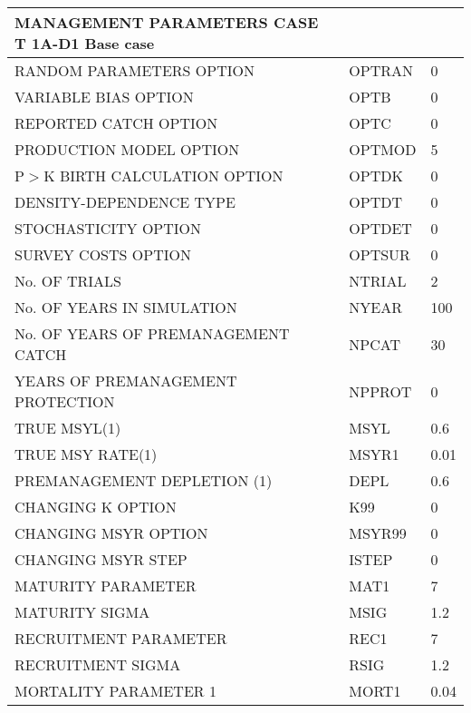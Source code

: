 \begin{table}[ht]
\centering
\begin{tabular}{lll}
 MANAGEMENT PARAMETERS         CASE  T 1A-D1 
Base case &  &  \\ 
  \hline
RANDOM PARAMETERS OPTION              & OPTRAN  & 0    \\ 
  VARIABLE BIAS OPTION                  & OPTB    & 0    \\ 
  REPORTED CATCH OPTION                 & OPTC    & 0    \\ 
  PRODUCTION MODEL OPTION               & OPTMOD  & 5    \\ 
  P$>$K BIRTH CALCULATION OPTION          & OPTDK   & 0    \\ 
  DENSITY-DEPENDENCE TYPE               & OPTDT   & 0    \\ 
  STOCHASTICITY OPTION                  & OPTDET  & 0    \\ 
  SURVEY COSTS OPTION                   & OPTSUR  & 0    \\ 
  No. OF TRIALS                         & NTRIAL  & 2    \\ 
  No. OF YEARS IN SIMULATION            & NYEAR   & 100  \\ 
  No. OF YEARS OF PREMANAGEMENT CATCH   & NPCAT   & 30   \\ 
  YEARS OF PREMANAGEMENT PROTECTION     & NPPROT  & 0    \\ 
  TRUE MSYL(1)                          & MSYL    & 0.6  \\ 
  TRUE MSY RATE(1)                      & MSYR1   & 0.01 \\ 
  PREMANAGEMENT DEPLETION (1)           & DEPL    & 0.6  \\ 
  CHANGING K OPTION                     & K99     & 0    \\ 
  CHANGING MSYR OPTION                  & MSYR99  & 0    \\ 
  CHANGING MSYR STEP                    & ISTEP   & 0    \\ 
  MATURITY PARAMETER                    & MAT1    & 7    \\ 
  MATURITY SIGMA                        & MSIG    & 1.2  \\ 
  RECRUITMENT PARAMETER                 & REC1    & 7    \\ 
  RECRUITMENT SIGMA                     & RSIG    & 1.2  \\ 
  MORTALITY PARAMETER 1                 & MORT1   & 0.04 \\ 

\end{tabular}
\end{table}
